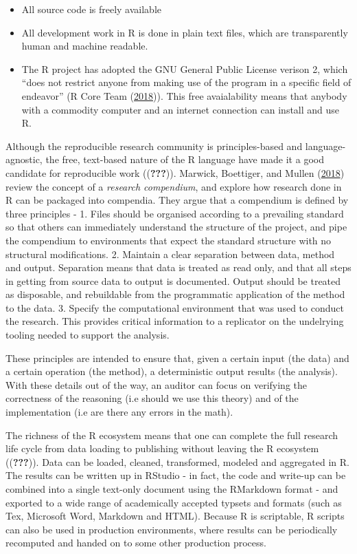 \documentclass[11pt,preprint, authoryear]{elsarticle}
\numberwithin{equation}{section}
\numberwithin{figure}{section}
\numberwithin{table}{section}
\def\tightlist{} %
\begin{document}
\begin{itemize}
\tightlist
\item
  All source code is freely available
\item
  All development work in R is done in plain text files, which are
  transparently human and machine readable.
\item
  The R project has adopted the GNU General Public License verison 2,
  which ``does not restrict anyone from making use of the program in a
  specific field of endeavor'' (R Core Team
  (\protect\hyperlink{ref-RCoreTeam2018}{2018})). This free
  avaialability means that anybody with a commodity computer and an
  internet connection can install and use R.
\end{itemize}

Although the reproducible research community is principles-based and
language-agnostic, the free, text-based nature of the R language have
made it a good candidate for reproducible work (({\textbf{???}})).
Marwick, Boettiger, and Mullen
(\protect\hyperlink{ref-Marwick2018}{2018}) review the concept of a
\emph{research compendium}, and explore how research done in R can be
packaged into compendia. They argue that a compendium is defined by
three principles - 1. Files should be organised according to a
prevailing standard so that others can immediately understand the
structure of the project, and pipe the compendium to environments that
expect the standard structure with no structural modifications. 2.
Maintain a clear separation between data, method and output. Separation
means that data is treated as read only, and that all steps in getting
from source data to output is documented. Output should be treated as
disposable, and rebuildable from the programmatic application of the
method to the data. 3. Specify the computational environment that was
used to conduct the research. This provides critical information to a
replicator on the undelrying tooling needed to support the analysis.

These principles are intended to ensure that, given a certain input (the
data) and a certain operation (the method), a deterministic output
results (the analysis). With these details out of the way, an auditor
can focus on verifying the correctness of the reasoning (i.e should we
use this theory) and of the implementation (i.e are there any errors in
the math).

The richness of the R ecosystem means that one can complete the full
research life cycle from data loading to publishing without leaving the
R ecosystem (({\textbf{???}})). Data can be loaded, cleaned,
transformed, modeled and aggregated in R. The results can be written up
in RStudio - in fact, the code and write-up can be combined into a
single text-only document using the RMarkdown format - and exported to a
wide range of academically accepted typsets and formats (such as Tex,
Microsoft Word, Markdown and HTML). Because R is scriptable, R scripts
can also be used in production environments, where results can be
periodically recomputed and handed on to some other production process.
\end{document}
